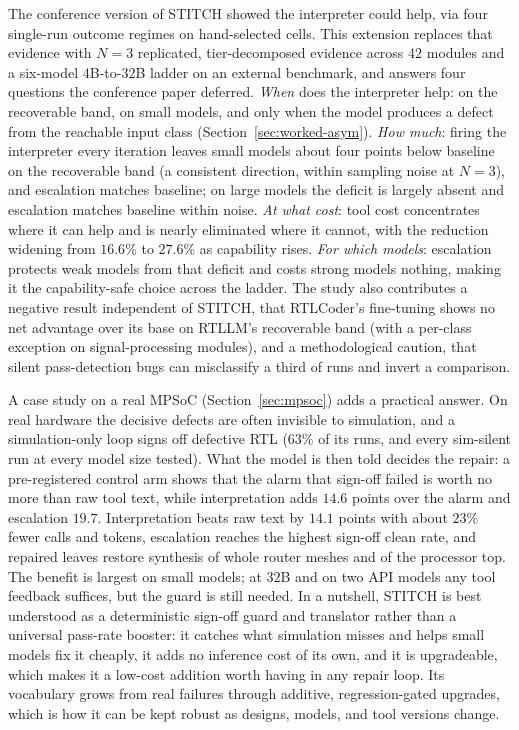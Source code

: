 \documentclass[11pt]{article}
\begin{document}
The conference version of STITCH showed the interpreter could help, via four
single-run outcome regimes on hand-selected cells. This extension replaces
that evidence with $N{=}3$ replicated, tier-decomposed evidence across $42$
modules and a six-model $4$B-to-$32$B ladder on an external benchmark, and
answers four questions the conference paper deferred. \emph{When} does the
interpreter help: on the recoverable band, on small models, and only when the
model produces a defect from the reachable input class
(Section~\ref{sec:worked-asym}). \emph{How much}: firing the interpreter every
iteration leaves small models about four points below baseline on the
recoverable band (a consistent direction, within sampling noise at $N{=}3$),
and escalation matches baseline; on large models the deficit is largely absent
and escalation matches baseline within noise. \emph{At what cost}: tool cost
concentrates where it can help and is nearly eliminated where it cannot, with
the reduction widening from $16.6\%$ to $27.6\%$ as capability rises.
\emph{For which models}: escalation protects weak models from that deficit and
costs strong models nothing, making it the capability-safe choice across the
ladder. The study also contributes a negative result independent of STITCH,
that RTLCoder's fine-tuning shows no net advantage over its base on RTLLM's
recoverable band (with a per-class exception on signal-processing modules), and
a methodological caution, that silent pass-detection bugs can misclassify a
third of runs and invert a comparison.

A case study on a real MPSoC (Section~\ref{sec:mpsoc}) adds a practical
answer. On real hardware the decisive defects are often invisible to
simulation, and a simulation-only loop signs off defective RTL ($63\%$ of its
runs, and every sim-silent run at every model size tested). What the model is
then told decides the repair: a pre-registered control arm shows that the
alarm that sign-off failed is worth no more than raw tool text, while
interpretation adds $14.6$ points over the alarm and escalation $19.7$.
Interpretation beats raw text by $14.1$ points with about $23\%$ fewer calls
and tokens, escalation reaches the highest sign-off clean rate, and repaired
leaves restore synthesis of whole router meshes and of the processor top. The
benefit is largest on small models; at $32$B and on two API models any tool
feedback suffices, but the guard is still needed. In a
nutshell, STITCH is best understood as a deterministic sign-off guard and
translator rather than a universal pass-rate booster: it catches what
simulation misses and helps small models fix it cheaply, it adds no inference
cost of its own, and it is upgradeable, which makes it a low-cost addition
worth having in any repair loop. Its vocabulary grows from real failures
through additive, regression-gated upgrades, which is how it can be kept
robust as designs, models, and tool versions change.
\end{document}
